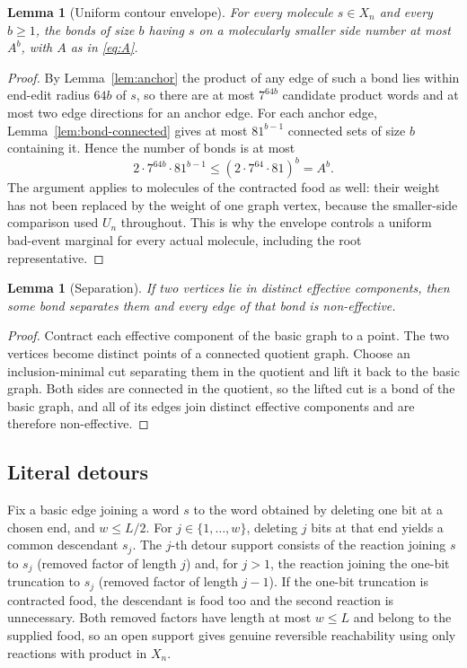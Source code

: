 \documentclass[11pt,reqno]{amsart}
\theoremstyle{plain}
\newtheorem{lemma}[theorem]{Lemma}
\theoremstyle{definition}
\theoremstyle{remark}
\numberwithin{equation}{section}
\begin{document}
\begin{lemma}[Uniform contour envelope]\label{lem:envelope}
For every molecule $s\in X_n$ and every $b\ge1$, the bonds of size $b$ having $s$ on a molecularly smaller side number at most $A^{b}$, with $A$ as in \eqref{eq:A}.
\end{lemma}

\begin{proof}
By Lemma~\ref{lem:anchor} the product of any edge of such a bond lies within end-edit radius $64b$ of $s$, so there are at most $7^{64b}$ candidate product words and at most two edge directions for an anchor edge. For each anchor edge, Lemma~\ref{lem:bond-connected} gives at most $81^{b-1}$ connected sets of size $b$ containing it. Hence the number of bonds is at most
\[
2\cdot7^{64b}\cdot81^{b-1}\le(2\cdot7^{64}\cdot81)^{b}=A^{b}.
\]
The argument applies to molecules of the contracted food as well: their weight has not been replaced by the weight of one graph vertex, because the smaller-side comparison used $U_n$ throughout. This is why the envelope controls a uniform bad-event marginal for every actual molecule, including the root representative.
\end{proof}

\begin{lemma}[Separation]\label{lem:separation}
If two vertices lie in distinct effective components, then some bond separates them and every edge of that bond is non-effective.
\end{lemma}

\begin{proof}
Contract each effective component of the basic graph to a point. The two vertices become distinct points of a connected quotient graph. Choose an inclusion-minimal cut separating them in the quotient and lift it back to the basic graph. Both sides are connected in the quotient, so the lifted cut is a bond of the basic graph, and all of its edges join distinct effective components and are therefore non-effective.
\end{proof}

\subsection{Literal detours}
Fix a basic edge joining a word $s$ to the word obtained by deleting one bit at a chosen end, and $w\le L/2$. For $j\in\{1,\dots,w\}$, deleting $j$ bits at that end yields a common descendant $s_j$. The $j$-th detour support consists of the reaction joining $s$ to $s_j$ (removed factor of length $j$) and, for $j>1$, the reaction joining the one-bit truncation to $s_j$ (removed factor of length $j-1$). If the one-bit truncation is contracted food, the descendant is food too and the second reaction is unnecessary. Both removed factors have length at most $w\le L$ and belong to the supplied food, so an open support gives genuine reversible reachability using only reactions with product in $X_n$.
\end{document}
